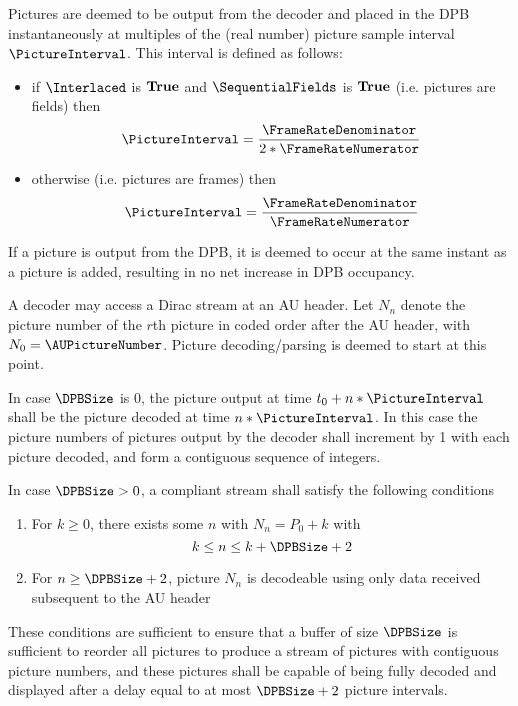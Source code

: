 Pictures are deemed to be output from the decoder and placed in the DPB instantaneously at multiples
of the (real number) picture sample interval $\PictureInterval$. This interval is defined as follows:
\begin{itemize}
\item if $\Interlaced$ is $\text{\bf{True}}$ and $\SequentialFields$ is $\text{\bf{True}}$ (i.e. pictures are fields) then 
\begin{equation*}
\PictureInterval=\dfrac{\FrameRateDenominator}{2*\FrameRateNumerator}
\end{equation*}
\item otherwise (i.e. pictures are frames) then 
\begin{equation*}
\PictureInterval=\dfrac{\FrameRateDenominator}{\FrameRateNumerator}
\end{equation*}
\end{itemize}

If a picture is output from the DPB, it is deemed to occur at the same instant as a picture is
added, resulting in no net increase in DPB occupancy.

A decoder may access a Dirac stream at an AU header. Let $N_n$ denote
the picture number of the $r$th picture in coded order after
the AU header, with $N_0=\AUPictureNumber$. Picture decoding/parsing 
is deemed to start at this point. 

In case $\DPBSize$ is 0, the picture output at time $t_0+n*\PictureInterval$
shall be the picture decoded at time $n*\PictureInterval$. In this case
the picture numbers of pictures output by the decoder shall increment
by 1 with each picture decoded, and form a contiguous sequence of integers.

In case $\DPBSize>0$, a compliant stream shall satisfy the following
conditions
\begin{enumerate}
\item For $k\geq 0$, there exists some $n$ with $N_n=P_0+k$ with
\[k\leq n\leq k+\DPBSize+2\]
\item For $n\geq\DPBSize+2$, picture $N_n$ is decodeable 
using only data received subsequent to the AU header
\end{enumerate}

These conditions are sufficient to ensure that a buffer of size $\DPBSize$
is sufficient to reorder all pictures to produce a stream of pictures
with contiguous picture numbers, and these pictures shall be capable of being fully 
decoded and displayed after a delay equal to at most $\DPBSize+2$ picture intervals.

